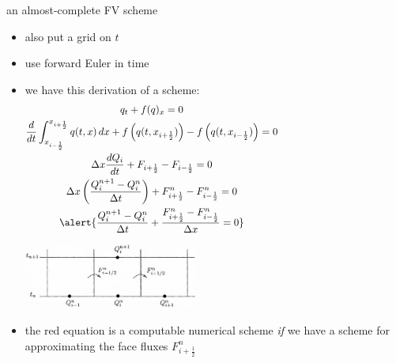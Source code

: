 \documentclass[10pt,dvipsnames,usepdftitle=false,
hyperref={pdftitle = {Finite volume methods},
    pdfauthor = {Ed Bueler}}]{beamer}
\newcommand{\xiphalf}{{x_{i+\frac{1}{2}}}}
\newcommand{\ximhalf}{{x_{i-\frac{1}{2}}}}
\newcommand{\Fiphalf}{{F_{i+\frac{1}{2}}}}
\newcommand{\Fimhalf}{{F_{i-\frac{1}{2}}}}
\newcommand{\Fiphalfn}{{F^n_{i+\frac{1}{2}}}}
\newcommand{\Fimhalfn}{{F^n_{i-\frac{1}{2}}}}
\begin{document}
\begin{frame}{an almost-complete FV scheme}

\begin{itemize}
\item also put a grid on $t$
\item use forward Euler in time
\item we have this derivation of a scheme:
\small
\begin{gather*}
q_t + f(q)_x = 0 \hspace{50mm} \\
\frac{d}{dt} \int_\ximhalf^\xiphalf q(t,x) \,dx + f\left(q(t,\xiphalf)\right) - f\left(q(t,\ximhalf)\right) = 0 \hspace{50mm} \\
\Delta x \frac{dQ_i}{dt} + \Fiphalf - \Fimhalf = 0 \hspace{50mm} \\
\Delta x \left(\frac{Q_i^{n+1} - Q_i^n}{\Delta t}\right) + \Fiphalfn - \Fimhalfn = 0 \hspace{50mm} \\
\alert{\frac{Q_i^{n+1} - Q_i^n}{\Delta t} + \frac{\Fiphalfn - \Fimhalfn}{\Delta x} = 0} \hspace{50mm}
\end{gather*}

\vspace{-15mm}

\hfill \includegraphics[width=0.45\textwidth]{figs/leveque4p1}

\normalsize
\medskip
\item the \alert{red equation} is a computable numerical scheme \emph{if} we have a scheme for approximating the face fluxes $\Fiphalfn$
\end{itemize}
\end{frame}
\end{document}
